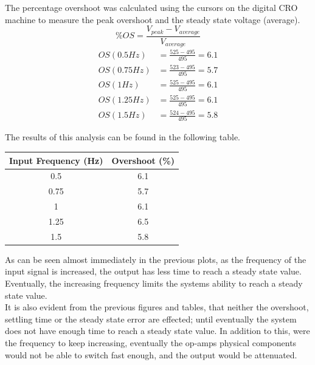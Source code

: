 \documentclass[11pt,a4paper]{article}
\begin{document}
\begin{enumerate}
	\pagebreak
	The percentage overshoot was calculated using the cursors on the digital CRO machine to measure the peak overshoot and the steady state voltage (average). 
	$$ \%OS = \frac{V_{peak}-V_{average}}{V_{average}} $$
	\begin{align*}
	OS(0.5Hz) 	&= \frac{525-495}{495} = 6.1 	\\
	OS(0.75Hz) 	&= \frac{523-495}{495} = 5.7 	\\
	OS(1Hz) 	&= \frac{525-495}{495} = 6.1 	\\
	OS(1.25Hz) 	&= \frac{525-495}{495} = 6.1 	\\
	OS(1.5Hz) 	&= \frac{524-495}{495} = 5.8 	
	\end{align*}
	
	The results of this analysis can be found in the following table.
	
\begin{center}
    \begin{tabular}{| c | c |}
    \hline
    Input Frequency (Hz)  & Overshoot (\%)  \\ \hline
    0.5  	                  & 6.1  		\\ \hline
	0.75  	                  & 5.7  		\\ \hline
	1		                  & 6.1 		\\ \hline
	1.25	                  & 6.5 		\\ \hline
	1.5		                  & 5.8 		\\
    \hline
    \end{tabular}
\end{center}


	
	As can be seen almost immediately in the previous plots, as the frequency of the input signal is increased, the output has less time to reach a steady state value. %
	Eventually, the increasing frequency limits the systems ability to reach a steady state value.\\
	
	It is also evident from the previous figures and tables, that neither the overshoot, settling time or the steady state error are effected; until eventually the system does not have enough time to reach a steady state value. In addition to this, were the frequency to keep increasing, eventually the op-amps physical components would not be able to switch fast enough, and the output would be attenuated.\\
	

\end{enumerate}
\end{document}
